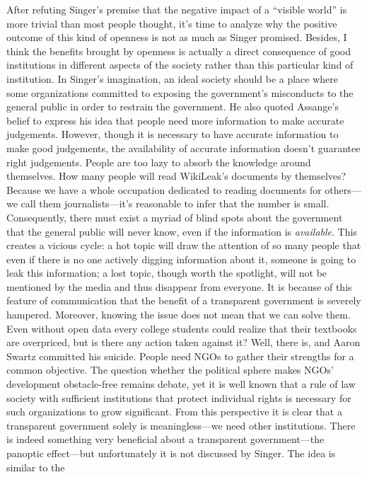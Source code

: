 \documentclass{writing}
\begin{document}
After refuting Singer's premise that the negative impact of a ``visible
world'' is more trivial than most people thought, it's time to analyze
why the positive outcome of this kind of openness is not as much as
Singer promised. Besides, I think the benefits brought by openness is
actually a direct consequence of good institutions in different aspects
of the society rather than this particular kind of institution. In
Singer's imagination, an ideal society should be a place where some
organizations committed to exposing the government's misconducts to the
general public in order to restrain the government. He also quoted
Assange's belief to express his idea that people need more information
to make accurate judgements. However, though it is necessary to have
accurate information to make good judgements, the availability of
accurate information doesn't guarantee right judgements. People are too
lazy to absorb the knowledge around themselves. How many people will
read WikiLeak's documents by themselves? Because we have a whole
occupation dedicated to reading documents for others---we call them
journalists---it's reasonable to infer that the number is small.
Consequently, there must exist a myriad of blind spots about the
government that the general public will never know, even if the
information is \emph{available}. This creates a vicious cycle: a hot
topic will draw the attention of so many people that even if there is no
one actively digging information about it, someone is going to leak this
information; a lost topic, though worth the spotlight, will not be
mentioned by the media and thus disappear from everyone. It is because
of this feature of communication that the benefit of a transparent
government is severely hampered. Moreover, knowing the issue does not
mean that we can solve them. Even without open data every college
students could realize that their textbooks are overpriced, but is there
any action taken against it? Well, there is, and Aaron Swartz committed
his suicide. People need NGOs to gather their strengths for a common
objective. The question whether the political sphere makes NGOs'
development obstacle-free remains debate, yet it is well known that a
rule of law society with sufficient institutions that protect individual
rights is necessary for such organizations to grow significant. From
this perspective it is clear that a transparent government solely is
meaningless---we need other institutions. There is indeed something very
beneficial about a transparent government---the panoptic effect---but
unfortunately it is not discussed by Singer. The idea is similar to the
\end{document}
